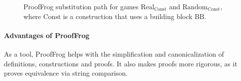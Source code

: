 \begin{figure}[ht]
    \centering
    \nicoresetlinenr%
    
    \caption{ProofFrog substitution path for games $\mathrm{Real}_\mathrm{Const}$ and $\mathrm{Random}_\mathrm{Const}$, where $\mathrm{Const}$ is a construction that uses a building block $\mathrm{BB}$.}
    \label{fig:pf:strategy}
\end{figure}

\paragraph{Advantages of ProofFrog} 
As a tool, ProofFrog helps with the simplification and canonicalization of definitions, constructions and proofs.
It also makes proofs more rigorous, as it proves equivalence via string comparison.
